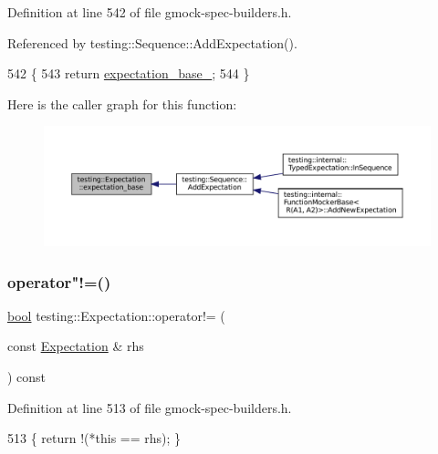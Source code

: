 Definition at line 542 of file gmock-\/spec-\/builders.\+h.



Referenced by testing\+::\+Sequence\+::\+Add\+Expectation().


\begin{DoxyCode}
542                            \{
543     \textcolor{keywordflow}{return} \hyperlink{classtesting_1_1Expectation_a96caf8f40e769b68ea010c098f7190fa}{expectation\_base\_};
544   \}
\end{DoxyCode}
Here is the caller graph for this function\+:
\nopagebreak
\begin{figure}[H]
\begin{center}
\leavevmode
\includegraphics[width=350pt]{classtesting_1_1Expectation_abd4dcb022d192d92b529d1ddefbfd8a9_icgraph}
\end{center}
\end{figure}
\mbox{\label{classtesting_1_1Expectation_a65d348ba9164e204feed37be93f655b0}} 
\subsubsection{\texorpdfstring{operator"!=()}{operator!=()}}
{\footnotesize\ttfamily \hyperlink{classbool}{bool} testing\+::\+Expectation\+::operator!= (\begin{DoxyParamCaption}\item[{const \hyperlink{classtesting_1_1Expectation}{Expectation} \&}]{rhs }\end{DoxyParamCaption}) const\hspace{0.3cm}{\ttfamily [inline]}}



Definition at line 513 of file gmock-\/spec-\/builders.\+h.


\begin{DoxyCode}
513 \{ \textcolor{keywordflow}{return} !(*\textcolor{keyword}{this} == rhs); \}
\end{DoxyCode}
\mbox{\label{classtesting_1_1Expectation_a319f0eea03bd4e6dd0000306fb2ed6ca}} 

